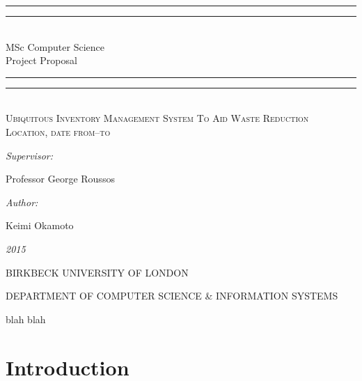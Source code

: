 \documentclass[a4paper, 11pt]{article}
\newlength{\drop}
\begin{document}
  \begin{titlepage}
    \textheight
    \centering
    \vspace*{\baselineskip}
    \rule{\textwidth}{1.6pt}\vspace*{-\baselineskip}\vspace*{2pt}
    \rule{\textwidth}{0.4pt}\\[\baselineskip]
    {\Large{MSc Computer Science\\[0.3\baselineskip] }}
    {\huge{Project Proposal\\[0.3\baselineskip] }}
	
    \rule{\textwidth}{0.4pt}\vspace*{-\baselineskip}\vspace{3.2pt}
    \rule{\textwidth}{1.6pt}
    \\[\baselineskip]
    \scshape
    {\Large Ubiquitous Inventory Management System To Aid Waste Reduction \\}
    Location, date from--to\par
    \vspace*{2\baselineskip}
    {\normalsize\emph{Supervisor: }{\large Professor George Roussos\par}}
    {\normalsize\emph{Author: }{\large Keimi Okamoto\par}}
    
    {\itshape 2015}
    \vfill
    {\large BIRKBECK UNIVERSITY OF LONDON\par}
{\footnotesize DEPARTMENT OF COMPUTER SCIENCE \& INFORMATION SYSTEMS}\par
  \end{titlepage}
  
\tableofcontents
\clearpage

blah blah
\clearpage

\section{Introduction}
\end{document}
